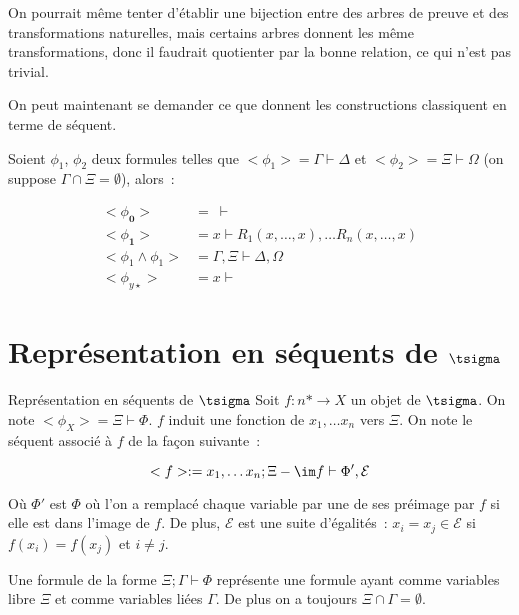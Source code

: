 \begin{rem}
    On pourrait même tenter d'établir une bijection entre des arbres de preuve
    et des transformations naturelles, mais certains arbres donnent les même
    transformations, donc il faudrait quotienter par la bonne relation, ce qui
    n'est pas trivial.
\end{rem}

On peut maintenant se demander ce que donnent les constructions classiquent en terme
de séquent.

\begin{lem}\label{seqStandarts}
    Soient $\phi_1$, $\phi_2$ deux formules telles que $<\phi_1> = \Gamma\vdash\Delta$ et
    $<\phi_2> = \Xi\vdash\Omega$ (on suppose $\Gamma\cap\Xi=\emptyset$), alors~:

    \begin{align*}
        <\phi_\mathbf{0}> &=~\vdash \\
        <\phi_\mathbf{1}> &= x\vdash R_1(x,\dots, x),\dots R_n(x, \dots, x) \\
        <\phi_1\wedge\phi_1> &= \Gamma,\Xi\vdash\Delta,\Omega \\
        <\phi_{y\star}> &= x\vdash
    \end{align*}
\end{lem}

\section{Représentation en séquents de $\tsigma$}\label{seqTSigma}

\begin{defi}{Représentation en séquents de $\tsigma$}
    Soit $f : n\ast\rightarrow X$ un objet de $\tsigma$. On note
    $<\phi_X> = \Xi\vdash\Phi$. $f$ induit une fonction de $x_1,\dots x_n$ vers $\Xi$.
    On note le séquent associé à $f$ de la façon suivante~:

    \[ <f> := x_1, \dots x_n; \Xi - \im f\vdash \Phi',\mathcal{E} \]

    Où $\Phi'$ est $\Phi$ où l'on a remplacé chaque variable par une de ses préimage
    par $f$ si elle est dans l'image de $f$. De plus, $\mathcal{E}$ est une suite
    d'égalités~: $x_i=x_j\in\mathcal{E}$ si $f(x_i) = f(x_j)$ et $i\neq j$.

    Une formule de la forme $\Xi;\Gamma\vdash \Phi$ représente une formule ayant comme
    variables libre $\Xi$ et comme variables liées $\Gamma$. De plus on a toujours
    $\Xi\cap\Gamma=\emptyset$.
\end{defi}

